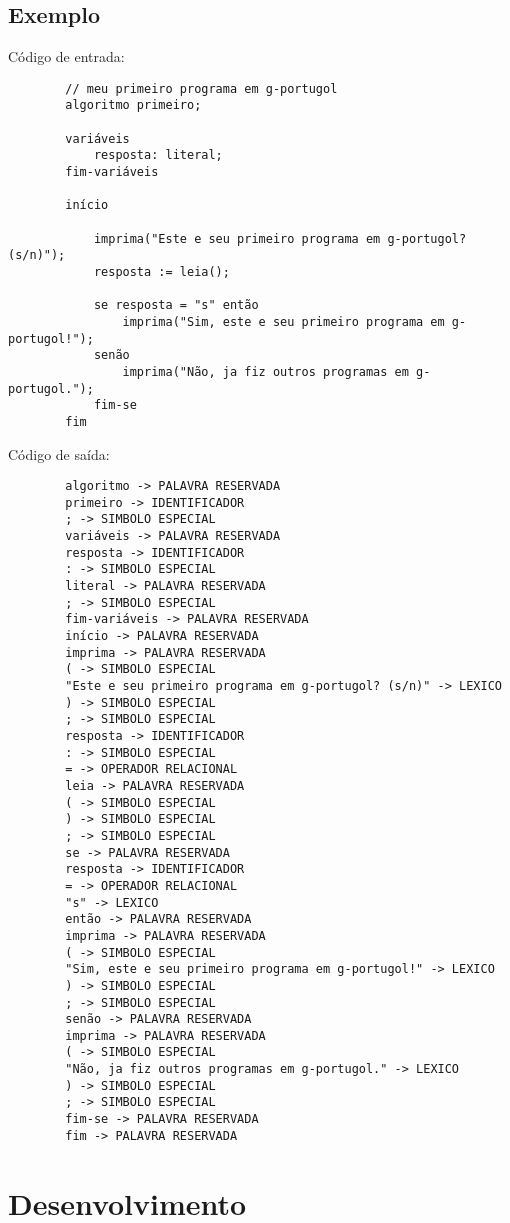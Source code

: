 \documentclass[a4paper,10pt]{article}
\begin{document}
	\subsection{Exemplo}
		Código de entrada:

		\begin{verbatim}
		// meu primeiro programa em g-portugol
		algoritmo primeiro;

		variáveis
			resposta: literal;
		fim-variáveis

		início

			imprima("Este e seu primeiro programa em g-portugol? (s/n)");
			resposta := leia();

			se resposta = "s" então
				imprima("Sim, este e seu primeiro programa em g-portugol!");
			senão
				imprima("Não, ja fiz outros programas em g-portugol.");
			fim-se
		fim
		\end{verbatim}

		Código de saída:

		\begin{verbatim}
		algoritmo -> PALAVRA RESERVADA
		primeiro -> IDENTIFICADOR
		; -> SIMBOLO ESPECIAL
		variáveis -> PALAVRA RESERVADA
		resposta -> IDENTIFICADOR
		: -> SIMBOLO ESPECIAL
		literal -> PALAVRA RESERVADA
		; -> SIMBOLO ESPECIAL
		fim-variáveis -> PALAVRA RESERVADA
		início -> PALAVRA RESERVADA
		imprima -> PALAVRA RESERVADA
		( -> SIMBOLO ESPECIAL
		"Este e seu primeiro programa em g-portugol? (s/n)" -> LEXICO
		) -> SIMBOLO ESPECIAL
		; -> SIMBOLO ESPECIAL
		resposta -> IDENTIFICADOR
		: -> SIMBOLO ESPECIAL
		= -> OPERADOR RELACIONAL
		leia -> PALAVRA RESERVADA
		( -> SIMBOLO ESPECIAL
		) -> SIMBOLO ESPECIAL
		; -> SIMBOLO ESPECIAL
		se -> PALAVRA RESERVADA
		resposta -> IDENTIFICADOR
		= -> OPERADOR RELACIONAL
		"s" -> LEXICO
		então -> PALAVRA RESERVADA
		imprima -> PALAVRA RESERVADA
		( -> SIMBOLO ESPECIAL
		"Sim, este e seu primeiro programa em g-portugol!" -> LEXICO
		) -> SIMBOLO ESPECIAL
		; -> SIMBOLO ESPECIAL
		senão -> PALAVRA RESERVADA
		imprima -> PALAVRA RESERVADA
		( -> SIMBOLO ESPECIAL
		"Não, ja fiz outros programas em g-portugol." -> LEXICO
		) -> SIMBOLO ESPECIAL
		; -> SIMBOLO ESPECIAL
		fim-se -> PALAVRA RESERVADA
		fim -> PALAVRA RESERVADA

		\end{verbatim}

		 


\section{Desenvolvimento}
\end{document}
